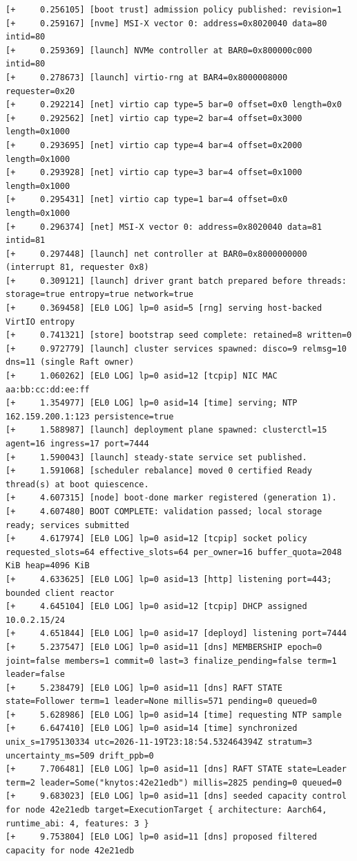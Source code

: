 \begin{verbatim}
[+     0.256105] [boot trust] admission policy published: revision=1
[+     0.259167] [nvme] MSI-X vector 0: address=0x8020040 data=80 intid=80
[+     0.259369] [launch] NVMe controller at BAR0=0x800000c000 intid=80
[+     0.278673] [launch] virtio-rng at BAR4=0x8000008000 requester=0x20
[+     0.292214] [net] virtio cap type=5 bar=0 offset=0x0 length=0x0
[+     0.292562] [net] virtio cap type=2 bar=4 offset=0x3000 length=0x1000
[+     0.293695] [net] virtio cap type=4 bar=4 offset=0x2000 length=0x1000
[+     0.293928] [net] virtio cap type=3 bar=4 offset=0x1000 length=0x1000
[+     0.295431] [net] virtio cap type=1 bar=4 offset=0x0 length=0x1000
[+     0.296374] [net] MSI-X vector 0: address=0x8020040 data=81 intid=81
[+     0.297448] [launch] net controller at BAR0=0x8000000000 (interrupt 81, requester 0x8)
[+     0.309121] [launch] driver grant batch prepared before threads: storage=true entropy=true network=true
[+     0.369458] [EL0 LOG] lp=0 asid=5 [rng] serving host-backed VirtIO entropy
[+     0.741321] [store] bootstrap seed complete: retained=8 written=0
[+     0.972779] [launch] cluster services spawned: disco=9 relmsg=10 dns=11 (single Raft owner)
[+     1.060262] [EL0 LOG] lp=0 asid=12 [tcpip] NIC MAC aa:bb:cc:dd:ee:ff
[+     1.354977] [EL0 LOG] lp=0 asid=14 [time] serving; NTP 162.159.200.1:123 persistence=true
[+     1.588987] [launch] deployment plane spawned: clusterctl=15 agent=16 ingress=17 port=7444
[+     1.590043] [launch] steady-state service set published.
[+     1.591068] [scheduler rebalance] moved 0 certified Ready thread(s) at boot quiescence.
[+     4.607315] [node] boot-done marker registered (generation 1).
[+     4.607480] BOOT COMPLETE: validation passed; local storage ready; services submitted
[+     4.617974] [EL0 LOG] lp=0 asid=12 [tcpip] socket policy requested_slots=64 effective_slots=64 per_owner=16 buffer_quota=2048 KiB heap=4096 KiB
[+     4.633625] [EL0 LOG] lp=0 asid=13 [http] listening port=443; bounded client reactor
[+     4.645104] [EL0 LOG] lp=0 asid=12 [tcpip] DHCP assigned 10.0.2.15/24
[+     4.651844] [EL0 LOG] lp=0 asid=17 [deployd] listening port=7444
[+     5.237547] [EL0 LOG] lp=0 asid=11 [dns] MEMBERSHIP epoch=0 joint=false members=1 commit=0 last=3 finalize_pending=false term=1 leader=false
[+     5.238479] [EL0 LOG] lp=0 asid=11 [dns] RAFT STATE state=Follower term=1 leader=None millis=571 pending=0 queued=0
[+     5.628986] [EL0 LOG] lp=0 asid=14 [time] requesting NTP sample
[+     6.647410] [EL0 LOG] lp=0 asid=14 [time] synchronized unix_s=1795130334 utc=2026-11-19T23:18:54.532464394Z stratum=3 uncertainty_ms=509 drift_ppb=0
[+     7.706481] [EL0 LOG] lp=0 asid=11 [dns] RAFT STATE state=Leader term=2 leader=Some("knytos:42e21edb") millis=2825 pending=0 queued=0
[+     9.683023] [EL0 LOG] lp=0 asid=11 [dns] seeded capacity control for node 42e21edb target=ExecutionTarget { architecture: Aarch64, runtime_abi: 4, features: 3 }
[+     9.753804] [EL0 LOG] lp=0 asid=11 [dns] proposed filtered capacity for node 42e21edb
\end{verbatim}

